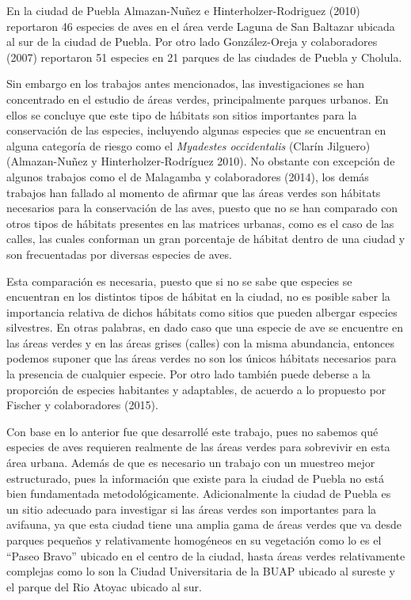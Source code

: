 \documentclass[letterpaper,12pt]{article}
\begin{document}
En la ciudad de Puebla Almazan-Nuñez e Hinterholzer-Rodriguez (2010) reportaron 46 especies de aves en el área verde Laguna de San Baltazar ubicada al sur de la ciudad de Puebla. Por otro lado González-Oreja y colaboradores (2007) reportaron 51 especies en  21 parques de las ciudades de Puebla y Cholula.

Sin embargo en los trabajos antes mencionados, las investigaciones se han concentrado en el estudio de áreas verdes, principalmente parques urbanos. En ellos se concluye que este tipo de hábitats son sitios importantes para la conservación de las especies, incluyendo algunas especies que se encuentran en  alguna categoría de riesgo como el  \textit{Myadestes occidentalis} (Clarín Jilguero) (Almazan-Nuñez y Hinterholzer-Rodríguez 2010). No obstante con excepción de algunos  trabajos como el de Malagamba y colaboradores (2014), los demás trabajos han fallado al momento de afirmar que las áreas verdes son hábitats necesarios para la conservación de las aves, puesto que no se han comparado con otros tipos de hábitats presentes en las matrices urbanas, como es el caso de las calles, las cuales conforman un gran porcentaje de hábitat dentro de una ciudad y son frecuentadas por diversas especies de aves.

Esta comparación es necesaria, puesto que si no se sabe que especies se encuentran en los distintos tipos de hábitat en la ciudad, no es posible saber la importancia relativa de dichos hábitats como sitios que pueden albergar especies silvestres. En otras palabras, en dado caso que una especie de ave se encuentre en las áreas verdes y en las áreas grises (calles) con la misma abundancia, entonces podemos suponer que las áreas verdes no son los únicos hábitats necesarios para la presencia de cualquier especie. Por otro lado también puede deberse a la proporción de especies habitantes y adaptables, de acuerdo a lo propuesto por Fischer y colaboradores (2015).


Con base en lo anterior fue que desarrollé este trabajo, pues no sabemos qué especies de aves requieren realmente de las áreas verdes para sobrevivir en esta área urbana. Además de que es necesario un trabajo con un muestreo mejor estructurado, pues la información que existe para la ciudad de Puebla no está bien fundamentada metodológicamente.
Adicionalmente la ciudad de Puebla es un sitio adecuado para investigar si las áreas verdes son importantes para la avifauna,  ya que esta ciudad tiene una amplia gama de áreas verdes que va desde parques pequeños y relativamente homogéneos en su vegetación como lo es el ``Paseo Bravo'' ubicado en el centro de la ciudad, hasta áreas verdes relativamente complejas como lo son la Ciudad Universitaria de la BUAP ubicado al sureste y el parque del Rio Atoyac ubicado al sur.
\end{document}
